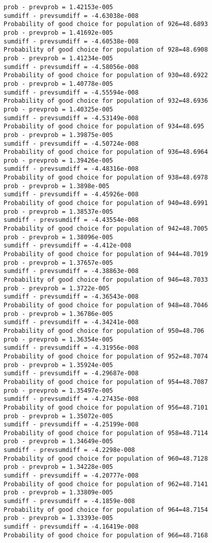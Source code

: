 \documentclass[11pt,onecolumn]{article}
\begin{document}
\begin{verbatim}
prob - prevprob = 1.42153e-005
sumdiff - prevsumdiff = -4.63038e-008
Probability of good choice for population of 926=48.6893
prob - prevprob = 1.41692e-005
sumdiff - prevsumdiff = -4.60538e-008
Probability of good choice for population of 928=48.6908
prob - prevprob = 1.41234e-005
sumdiff - prevsumdiff = -4.58056e-008
Probability of good choice for population of 930=48.6922
prob - prevprob = 1.40778e-005
sumdiff - prevsumdiff = -4.55594e-008
Probability of good choice for population of 932=48.6936
prob - prevprob = 1.40325e-005
sumdiff - prevsumdiff = -4.53149e-008
Probability of good choice for population of 934=48.695
prob - prevprob = 1.39875e-005
sumdiff - prevsumdiff = -4.50724e-008
Probability of good choice for population of 936=48.6964
prob - prevprob = 1.39426e-005
sumdiff - prevsumdiff = -4.48316e-008
Probability of good choice for population of 938=48.6978
prob - prevprob = 1.3898e-005
sumdiff - prevsumdiff = -4.45926e-008
Probability of good choice for population of 940=48.6991
prob - prevprob = 1.38537e-005
sumdiff - prevsumdiff = -4.43554e-008
Probability of good choice for population of 942=48.7005
prob - prevprob = 1.38096e-005
sumdiff - prevsumdiff = -4.412e-008
Probability of good choice for population of 944=48.7019
prob - prevprob = 1.37657e-005
sumdiff - prevsumdiff = -4.38863e-008
Probability of good choice for population of 946=48.7033
prob - prevprob = 1.3722e-005
sumdiff - prevsumdiff = -4.36543e-008
Probability of good choice for population of 948=48.7046
prob - prevprob = 1.36786e-005
sumdiff - prevsumdiff = -4.34241e-008
Probability of good choice for population of 950=48.706
prob - prevprob = 1.36354e-005
sumdiff - prevsumdiff = -4.31956e-008
Probability of good choice for population of 952=48.7074
prob - prevprob = 1.35924e-005
sumdiff - prevsumdiff = -4.29687e-008
Probability of good choice for population of 954=48.7087
prob - prevprob = 1.35497e-005
sumdiff - prevsumdiff = -4.27435e-008
Probability of good choice for population of 956=48.7101
prob - prevprob = 1.35072e-005
sumdiff - prevsumdiff = -4.25199e-008
Probability of good choice for population of 958=48.7114
prob - prevprob = 1.34649e-005
sumdiff - prevsumdiff = -4.2298e-008
Probability of good choice for population of 960=48.7128
prob - prevprob = 1.34228e-005
sumdiff - prevsumdiff = -4.20777e-008
Probability of good choice for population of 962=48.7141
prob - prevprob = 1.33809e-005
sumdiff - prevsumdiff = -4.1859e-008
Probability of good choice for population of 964=48.7154
prob - prevprob = 1.33393e-005
sumdiff - prevsumdiff = -4.16419e-008
Probability of good choice for population of 966=48.7168

\end{verbatim}
\end{document}

